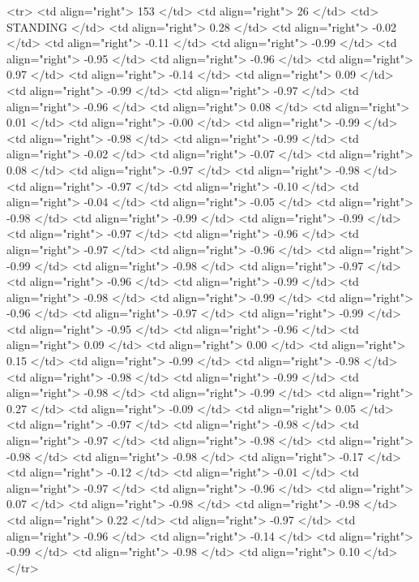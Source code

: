   <tr> <td align="right"> 153 </td> <td align="right">  26 </td> <td> STANDING </td> <td align="right"> 0.28 </td> <td align="right"> -0.02 </td> <td align="right"> -0.11 </td> <td align="right"> -0.99 </td> <td align="right"> -0.95 </td> <td align="right"> -0.96 </td> <td align="right"> 0.97 </td> <td align="right"> -0.14 </td> <td align="right"> 0.09 </td> <td align="right"> -0.99 </td> <td align="right"> -0.97 </td> <td align="right"> -0.96 </td> <td align="right"> 0.08 </td> <td align="right"> 0.01 </td> <td align="right"> -0.00 </td> <td align="right"> -0.99 </td> <td align="right"> -0.98 </td> <td align="right"> -0.99 </td> <td align="right"> -0.02 </td> <td align="right"> -0.07 </td> <td align="right"> 0.08 </td> <td align="right"> -0.97 </td> <td align="right"> -0.98 </td> <td align="right"> -0.97 </td> <td align="right"> -0.10 </td> <td align="right"> -0.04 </td> <td align="right"> -0.05 </td> <td align="right"> -0.98 </td> <td align="right"> -0.99 </td> <td align="right"> -0.99 </td> <td align="right"> -0.97 </td> <td align="right"> -0.96 </td> <td align="right"> -0.97 </td> <td align="right"> -0.96 </td> <td align="right"> -0.99 </td> <td align="right"> -0.98 </td> <td align="right"> -0.97 </td> <td align="right"> -0.96 </td> <td align="right"> -0.99 </td> <td align="right"> -0.98 </td> <td align="right"> -0.99 </td> <td align="right"> -0.96 </td> <td align="right"> -0.97 </td> <td align="right"> -0.99 </td> <td align="right"> -0.95 </td> <td align="right"> -0.96 </td> <td align="right"> 0.09 </td> <td align="right"> 0.00 </td> <td align="right"> 0.15 </td> <td align="right"> -0.99 </td> <td align="right"> -0.98 </td> <td align="right"> -0.98 </td> <td align="right"> -0.99 </td> <td align="right"> -0.98 </td> <td align="right"> -0.99 </td> <td align="right"> 0.27 </td> <td align="right"> -0.09 </td> <td align="right"> 0.05 </td> <td align="right"> -0.97 </td> <td align="right"> -0.98 </td> <td align="right"> -0.97 </td> <td align="right"> -0.98 </td> <td align="right"> -0.98 </td> <td align="right"> -0.98 </td> <td align="right"> -0.17 </td> <td align="right"> -0.12 </td> <td align="right"> -0.01 </td> <td align="right"> -0.97 </td> <td align="right"> -0.96 </td> <td align="right"> 0.07 </td> <td align="right"> -0.98 </td> <td align="right"> -0.98 </td> <td align="right"> 0.22 </td> <td align="right"> -0.97 </td> <td align="right"> -0.96 </td> <td align="right"> -0.14 </td> <td align="right"> -0.99 </td> <td align="right"> -0.98 </td> <td align="right"> 0.10 </td> </tr>
